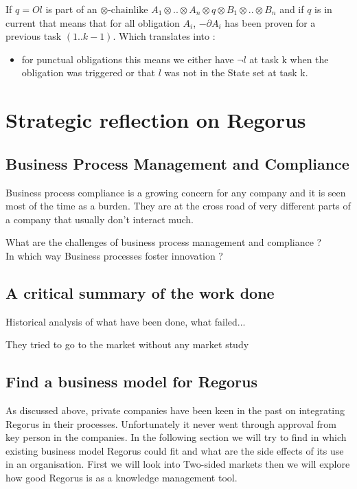 \documentclass[10pt]{report}
\newcommand{\ochain}{$\otimes \text{-chain}$}
\begin{document}
If $q=Ol$ is part of an \ochain like $A_{1}\otimes .. \otimes A_{n} \otimes q \otimes B_{1} \otimes .. \otimes B_{n}$ and if $q$ is in current that means that for all obligation $A_{i}$, $-\partial A_{i}$ has been proven for a previous task $(1..k-1)$. Which translates into :
\begin{itemize}
\item for punctual obligations this means we either have $\neg l$ at task k when the obligation was triggered or that $l$ was not in the State set at task k.
\end{itemize}

\newpage
\chapter{Strategic reflection on Regorus}

\section{Business Process Management and Compliance}
Business process compliance is a growing concern for any company and it is seen most of the time as a burden.  They are at the cross road of very different parts of a company that usually don't interact much.

What are the challenges of business process management and compliance ?\\
In which way Business processes foster innovation ?

\section{A critical summary of the work done}
Historical analysis of what have been done, what failed...

They tried to go to the market without any market study

\section{Find a business model for Regorus}

As discussed above, private companies have been keen in the past on integrating Regorus in their processes. Unfortunately it never went through approval from key person in the companies. In the following section we will try to find in which existing business model Regorus could fit and what are the side effects of its use in an organisation. First we will look into Two-sided markets then we will explore how good Regorus is as a knowledge management tool.
\end{document}
